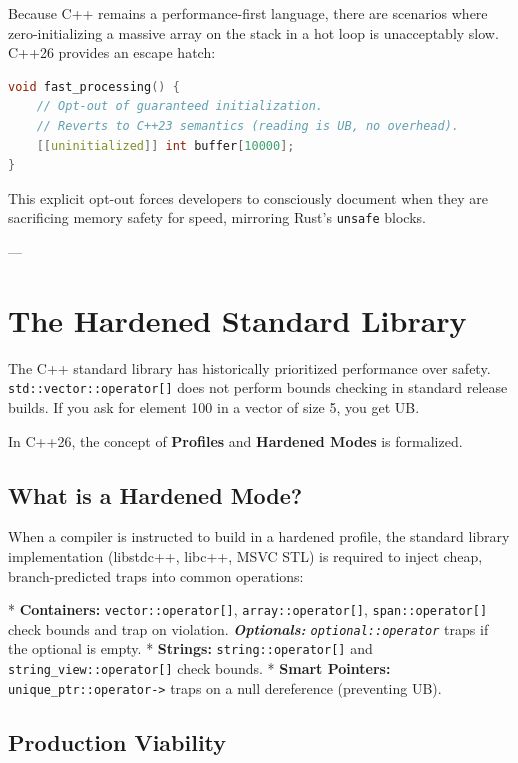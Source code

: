 {{{{{{Because C++ remains a performance-first language, there are scenarios where zero-initializing a massive array on the stack in a hot loop is unacceptably slow. C++26 provides an escape hatch:

\begin{lstlisting}[language=C++]
void fast_processing() {
    // Opt-out of guaranteed initialization. 
    // Reverts to C++23 semantics (reading is UB, no overhead).
    [[uninitialized]] int buffer[10000]; 
}
\end{lstlisting}

This explicit opt-out forces developers to consciously document when they are sacrificing memory safety for speed, mirroring Rust's \texttt{unsafe} blocks.

---

\section{The Hardened Standard Library}

The C++ standard library has historically prioritized performance over safety. \texttt{std::vector::operator[]} does not perform bounds checking in standard release builds. If you ask for element 100 in a vector of size 5, you get UB.

In C++26, the concept of \textbf{Profiles} and \textbf{Hardened Modes} is formalized.

\subsection{What is a Hardened Mode?}

When a compiler is instructed to build in a hardened profile, the standard library implementation (libstdc++, libc++, MSVC STL) is required to inject cheap, branch-predicted traps into common operations:

*   \textbf{Containers:} \texttt{vector::operator[]}, \texttt{array::operator[]}, \texttt{span::operator[]} check bounds and trap on violation.
\textit{   \textbf{Optionals:} \texttt{optional::operator}} traps if the optional is empty.
*   \textbf{Strings:} \texttt{string::operator[]} and \texttt{string_view::operator[]} check bounds.
*   \textbf{Smart Pointers:} \texttt{unique_ptr::operator->} traps on a null dereference (preventing UB).

\subsection{Production Viability}

}}}}}}
